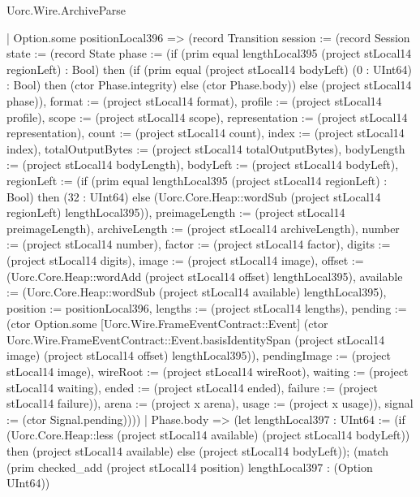 \begin{lexlean}{Uorc.Wire.ArchiveParse}
\begin{semanticmodule}
{          | Option.some positionLocal396 => (record Transition {session := (record Session {state := (record State {phase := (if (prim equal lengthLocal395 (project stLocal14 regionLeft) : Bool) then (if (prim equal (project stLocal14 bodyLeft) (0 : UInt64) : Bool) then (ctor Phase.integrity) else (ctor Phase.body)) else (project stLocal14 phase)), format := (project stLocal14 format), profile := (project stLocal14 profile), scope := (project stLocal14 scope), representation := (project stLocal14 representation), count := (project stLocal14 count), index := (project stLocal14 index), totalOutputBytes := (project stLocal14 totalOutputBytes), bodyLength := (project stLocal14 bodyLength), bodyLeft := (project stLocal14 bodyLeft), regionLeft := (if (prim equal lengthLocal395 (project stLocal14 regionLeft) : Bool) then (32 : UInt64) else (Uorc.Core.Heap::wordSub (project stLocal14 regionLeft) lengthLocal395)), preimageLength := (project stLocal14 preimageLength), archiveLength := (project stLocal14 archiveLength), number := (project stLocal14 number), factor := (project stLocal14 factor), digits := (project stLocal14 digits), image := (project stLocal14 image), offset := (Uorc.Core.Heap::wordAdd (project stLocal14 offset) lengthLocal395), available := (Uorc.Core.Heap::wordSub (project stLocal14 available) lengthLocal395), position := positionLocal396, lengths := (project stLocal14 lengths), pending := (ctor Option.some [Uorc.Wire.FrameEventContract::Event] (ctor Uorc.Wire.FrameEventContract::Event.basisIdentitySpan (project stLocal14 image) (project stLocal14 offset) lengthLocal395)), pendingImage := (project stLocal14 image), wireRoot := (project stLocal14 wireRoot), waiting := (project stLocal14 waiting), ended := (project stLocal14 ended), failure := (project stLocal14 failure)}), arena := (project x arena), usage := (project x usage)}), signal := (ctor Signal.pending)})))
        | Phase.body => (let lengthLocal397 : UInt64 := (if (Uorc.Core.Heap::less (project stLocal14 available) (project stLocal14 bodyLeft)) then (project stLocal14 available) else (project stLocal14 bodyLeft)); (match (prim checked_add (project stLocal14 position) lengthLocal397 : (Option UInt64))
}
\end{semanticmodule}
\end{lexlean}
